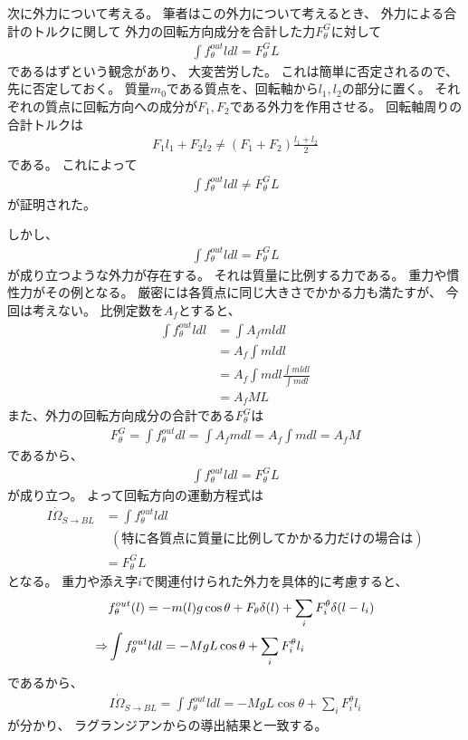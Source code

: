 \documentclass[a4paper,11pt]{jsarticle}
\begin{document}
次に外力について考える。
筆者はこの外力について考えるとき、
外力による合計のトルクに関して
外力の回転方向成分を合計した力$F_\theta^G$に対して
\begin{align*}
  \int f_\theta^{out} l dl = F_\theta^G L
\end{align*}
であるはずという観念があり、
大変苦労した。
これは簡単に否定されるので、
先に否定しておく。
質量$m_0$である質点を、回転軸から$l_1, l_2$の部分に置く。
それぞれの質点に回転方向への成分が$F_1, F_2$である外力を作用させる。
回転軸周りの合計トルクは
\begin{align*}
  F_1 l_1 + F_2 l_2
  \neq
  (F_1 + F_2) \frac{l_1 + l_2}{2}
\end{align*}
である。
これによって
\begin{align*}
  \int f_\theta^{out} l dl \neq F_\theta^G L
\end{align*}
が証明された。

しかし、
\begin{align*}
  \int f_\theta^{out} l dl = F_\theta^G L
\end{align*}
が成り立つような外力が存在する。
それは質量に比例する力である。
重力や慣性力がその例となる。
厳密には各質点に同じ大きさでかかる力も満たすが、
今回は考えない。
比例定数を$A_f$とすると、
\begin{align*}
  \int f_\theta^{out} l dl
  &= \int A_f m l dl
  \\
  &= A_f \int m l dl
  \\
  &= A_f \int m dl \frac{\int mldl}{\int mdl}
  \\
  &= A_f M L
\end{align*}
また、外力の回転方向成分の合計である$F_\theta^G$は
\begin{align*}
  F_\theta^G
  = \int f_\theta^{out} dl
  = \int A_f m dl
  = A_f \int mdl
  = A_f M
\end{align*}
であるから、
\begin{align*}
  \int f_\theta^{out} l dl = F_\theta^G L
\end{align*}
が成り立つ。
よって回転方向の運動方程式は
\begin{align*}
  I\dot\Omega_{S\rightarrow BL}{} 
  &= \int f_\theta^{out} l dl
  \\
  & \ \ \left( \mathrm{特に各質点に質量に比例してかかる力だけの場合は} \right)
  \\
  &= F_\theta^G L
\end{align*}
となる。
重力や添え字$i$で関連付けられた外力を具体的に考慮すると、
\begin{align}
  & f_\theta^{out}(l) = -m(l)g \cos\theta + F_\theta \delta(l) + \sum_i F_i^\theta \delta( l - l_i )
  \label{eq:newton:f_theta_out_conf}
  \\
  \Rightarrow
  & \int f_\theta^{out} l dl = -MgL \cos\theta + \sum_i F_i^\theta l_i
  \notag
\end{align}
であるから、
\begin{align}
  I\dot\Omega_{S\rightarrow BL}{} 
  = \int f_\theta^{out} l dl
  = -MgL\cos\theta + \sum_i F_i^\theta l_i
  \label{eq:newton:theta_end}
\end{align}
が分かり、
ラグランジアンからの導出結果と一致する。
\end{document}
